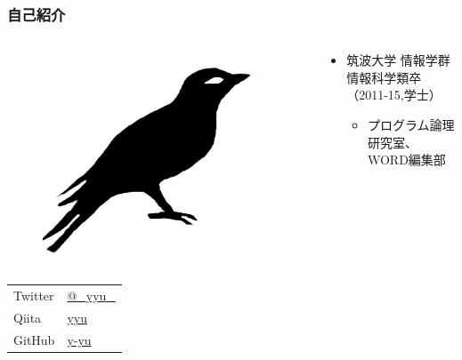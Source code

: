 \begin{frame}
  \frametitle{自己紹介}
  
  \begin{columns}
    \begin{column}{0.3\textwidth}
      \begin{center}
        \begin{figure}
          \includegraphics[width=0.95\textwidth]{img/bird2x.png}
        \end{figure}
      \end{center}
 
      \begin{table}[h]
        \begin{tabular}{ll}
          Twitter & \href{https://twitter.com/\_yyu\_}{@\_yyu\_} \\
          Qiita &  \href{https://qiita.com/yyu}{yyu} \\
          GitHub &  \href{https://github.com/y-yu}{y-yu} \\
        \end{tabular}
      \end{table}
    \end{column}
    \begin{column}{0.7\textwidth}
      \begin{itemize}
        \item 筑波大学 情報学群 情報科学類卒（2011-15,学士）
        \begin{itemize}
          \item プログラム論理研究室、WORD編集部
        \end{itemize}
        

\end{itemize}
\end{column}
\end{columns}
\end{frame}
